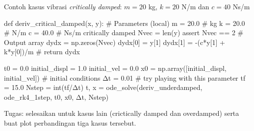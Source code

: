 \begin{frame}[fragile]

Contoh kasus vibrasi \textit{critically damped}: $m = 20$ kg, $k = 20$ N/m dan $c = 40$ Ns/m

\begin{pythoncode}
def deriv_critical_damped(x, y):
    # Parameters (local)
    m = 20.0   # kg
    k = 20.0   # N/m    
    c = 40.0   # Ns/m critically damped
    Nvec = len(y)
    assert Nvec == 2
    # Output array
    dydx = np.zeros(Nvec)
    dydx[0] = y[1]
    dydx[1] = -(c*y[1] + k*y[0])/m
    #
    return dydx
\end{pythoncode}

\end{frame}


\begin{frame}[fragile]

\begin{pythoncode}
t0 = 0.0
initial_displ = 1.0
initial_vel = 0.0
x0 = np.array([initial_displ, initial_vel]) # initial conditions
Δt = 0.01 # try playing with this parameter
tf = 15.0
Nstep = int(tf/Δt)
t, x = ode_solve(deriv_underdamped, ode_rk4_1step, t0, x0, Δt, Nstep)
\end{pythoncode}

Tugas: selesaikan untuk kasus lain (crictically damped dan overdamped) serta
buat plot perbandingan tiga kasus tersebut.

\end{frame}